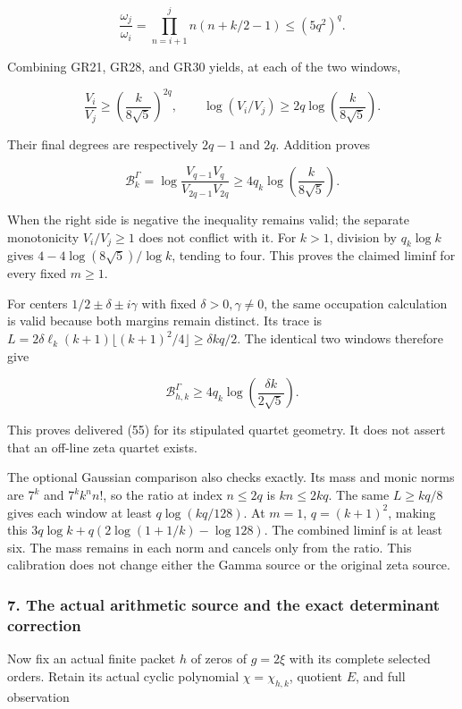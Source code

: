 \documentclass{article}
\begin{document}
\[
\frac{\omega_j}{\omega_i}
=\prod_{n=i+1}^{j}n(n+k/2-1)\le(5q^2)^q.
\tag{GR30}
\]

Combining GR21, GR28, and GR30 yields, at each of the two windows,

\[
\frac{V_i}{V_j}\ge\left(\frac{k}{8\sqrt5}\right)^{2q},
\qquad
\log(V_i/V_j)\ge2q\log\left(\frac{k}{8\sqrt5}\right).
\tag{GR31}
\]

Their final degrees are respectively \(2q-1\) and \(2q\). Addition proves

\[
\boxed{\mathcal B_k^\Gamma
=\log\frac{V_{q-1}V_q}{V_{2q-1}V_{2q}}
\ge4q_k\log\left(\frac{k}{8\sqrt5}\right).}
\tag{GR32}
\]

When the right side is negative the inequality remains valid; the separate monotonicity \(V_i/V_j\ge1\) does not conflict with it. For \(k>1\), division by \(q_k\log k\) gives \(4-4\log(8\sqrt5)/\log k\), tending to four. This proves the claimed liminf for every fixed \(m\ge1\).

For centers \(1/2\pm\delta\pm i\gamma\) with fixed \(\delta>0,\gamma\ne0\), the same occupation calculation is valid because both margins remain distinct. Its trace is \(L=2\delta\ell_k(k+1)\lfloor(k+1)^2/4\rfloor\ge\delta kq/2\). The identical two windows therefore give

\[
\mathcal B_{h,k}^{\Gamma}\ge4q_k\log\left(\frac{\delta k}{2\sqrt5}\right).
\tag{GR33}
\]

This proves delivered (55) for its stipulated quartet geometry. It does not assert that an off-line zeta quartet exists.

The optional Gaussian comparison also checks exactly. Its mass and monic norms are \(7^k\) and \(7^kk^nn!\), so the ratio at index \(n\le2q\) is \(kn\le2kq\). The same \(L\ge kq/8\) gives each window at least \(q\log(kq/128)\). At \(m=1\), \(q=(k+1)^2\), making this \(3q\log k+q(2\log(1+1/k)-\log128)\). The combined liminf is at least six. The mass remains in each norm and cancels only from the ratio. This calibration does not change either the Gamma source or the original zeta source.

\subsubsection{7. The actual arithmetic source and the exact determinant correction}\label{endpoint-gamma_review--the-actual-arithmetic-source-and-the-exact-determinant-correction}

Now fix an actual finite packet \(h\) of zeros of \(g=2\xi\) with its complete selected orders. Retain its actual cyclic polynomial \(\chi=\chi_{h,k}\), quotient \(E\), and full observation
\end{document}
